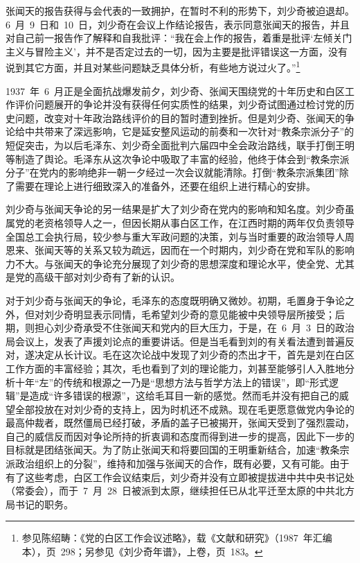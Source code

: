 张闻天的报告获得与会代表的一致拥护，在暂时不利的形势下，刘少奇被迫退却。6~月~9~日和~10~日，刘少奇在会议上作结论报告，表示同意张闻天的报告，并且对自己前一报告作了解释和自我批评：“我在会上作的报告，着重是批评‘左倾关门主义与冒险主义’，并不是否定过去的一切，因为主要是批评错误这一方面，没有说到其它方面，并且对某些问题缺乏具体分析，有些地方说过火了。”\footnote{参见陈绍畴：《党的白区工作会议述略》，载《文献和研究》（1987~年汇编本），页~298；另参见《刘少奇年谱》，上卷，页~183。}

1937~年~6~月正是全面抗战爆发前夕，刘少奇、张闻天围绕党的十年历史和白区工作评价问题展开的争论并没有获得任何实质性的结果，刘少奇试图通过检讨党的历史问题，改变对十年政治路线评价的目的暂时遭到挫折。但是刘少奇、张闻天的争论给中共带来了深远影响，它是延安整风运动的前奏和一次针对“教条宗派分子”的短促突击，为以后毛泽东、刘少奇全面批判六届四中全会政治路线，联手打倒王明等制造了舆论。毛泽东从这次争论中吸取了丰富的经验，他终于体会到“教条宗派分子”在党内的影响绝非一朝一夕经过一次会议就能清除。打倒“教条宗派集团”除了需要在理论上进行细致深入的准备外，还要在组织上进行精心的安排。

刘少奇与张闻天争论的另一结果是扩大了刘少奇在党内的影响和知名度。刘少奇虽属党的老资格领导人之一，但因长期从事白区工作，在江西时期的两年仅负责领导全国总工会执行局，较少参与重大军政问题的决策，刘与当时重要的政治领导人周恩来、张闻天等的关系又较为疏远，因而在一个时期内，刘少奇在党和军队的影响力不大。与张闻天的争论充分展现了刘少奇的思想深度和理论水平，使全党、尤其是党的高级干部对刘少奇有了新的认识。

对于刘少奇与张闻天的争论，毛泽东的态度既明确又微妙。初期，毛置身于争论之外，但对刘少奇明显表示同情，毛希望刘少奇的意见能被中央领导层所接受；后期，则担心刘少奇承受不住张闻天和党内的巨大压力，于是，在~6~月~3~日的政治局会议上，发表了声援刘论点的重要讲话。但是当毛看到刘的有关看法遭到普遍反对，遂决定从长计议。毛在这次论战中发现了刘少奇的杰出才干，首先是刘在白区工作方面的丰富经验；其次，毛也看到了刘的理论能力，刘甚至能够引人入胜地分析十年“左”的传统和根源之一乃是“思想方法与哲学方法上的错误”，即“形式逻辑”是造成“许多错误的根源”，这给毛耳目一新的感觉。然而毛并没有把自己的威望全部投放在对刘少奇的支持上，因为时机还不成熟。现在毛更愿意做党内争论的最高仲裁者，既然僵局已经打破，矛盾的盖子已被揭开，张闻天受到了强烈震动，自己的威信反而因对争论所持的折衷调和态度而得到进一步的提高，因此下一步的目标就是团结张闻天。为了防止张闻天和将要回国的王明重新结合，加速“教条宗派政治组织上的分裂”，维持和加强与张闻天的合作，既有必要，又有可能。由于有了这些考虑，白区工作会议结束后，刘少奇并没有立即被提拔进中共中央书记处（常委会），而于~7~月~28~日被派到太原，继续担任已从北平迁至太原的中共北方局书记的职务。

